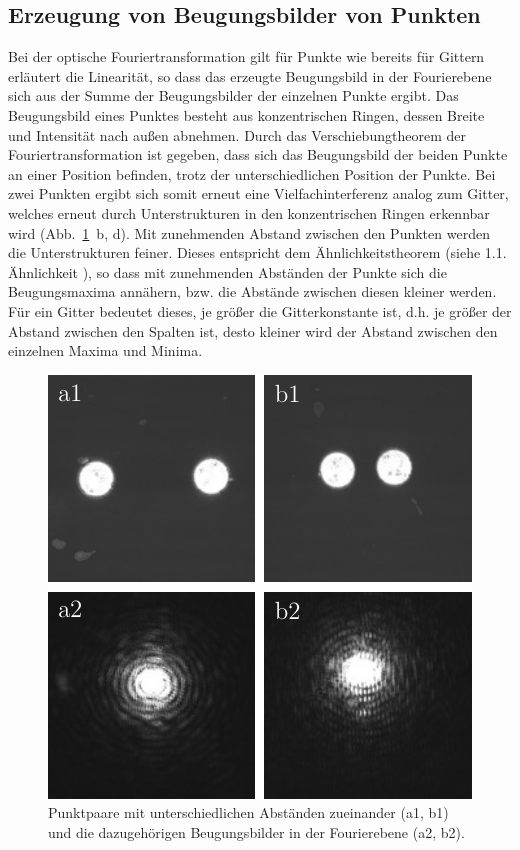\subsection{Erzeugung von Beugungsbilder von Punkten}

Bei der optische Fouriertransformation gilt für Punkte wie bereits für Gittern erläutert die Linearität, so dass das erzeugte Beugungsbild in der Fourierebene sich aus der Summe der Beugungsbilder der einzelnen Punkte ergibt. Das Beugungsbild eines Punktes besteht aus konzentrischen Ringen, dessen Breite und Intensität nach außen abnehmen. Durch das Verschiebungtheorem der Fouriertransformation ist gegeben, dass sich das Beugungsbild der beiden Punkte an einer Position befinden, trotz der unterschiedlichen Position der Punkte. Bei zwei Punkten ergibt sich somit erneut eine Vielfachinterferenz analog zum Gitter, welches erneut durch Unterstrukturen in den konzentrischen Ringen erkennbar wird (Abb.~\ref{fig:punktpaare_verschieden_und_spektren}~b, d). Mit zunehmenden Abstand zwischen den Punkten werden die Unterstrukturen feiner. Dieses entspricht dem Ähnlichkeitstheorem (siehe 1.1. Ähnlichkeit%
), so dass mit zunehmenden Abständen der Punkte sich die Beugungsmaxima annähern, bzw. die Abstände zwischen diesen kleiner werden. Für ein Gitter bedeutet dieses, je größer die Gitterkonstante ist, d.h. je größer der Abstand zwischen den Spalten ist, desto kleiner wird der Abstand zwischen den einzelnen Maxima und Minima.

\begin{figure}[h]
	\centering
	\includegraphics{images/Regina/abb15.pdf}
	\caption[Punktpaare unterschiedlicher Abstände und Fourierspektren]{
		Punktpaare mit unterschiedlichen Abständen zueinander (a1, b1) und die dazugehörigen Beugungsbilder in der Fourierebene (a2, b2).
	}
	\label{fig:punktpaare_verschieden_und_spektren}
\end{figure}


